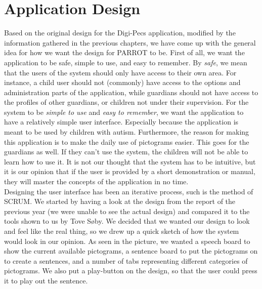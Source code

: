 \chapter{Application Design}
\label{appdes}
Based on the original design for the Digi-Pecs application, modified by the information gathered in the previous chapters, we have come up with the general idea for how we want the design for PARROT to be.\newline
First of all, we want the application to be safe, simple to use, and easy to remember.\newline
By \textit{safe}, we mean that the users of the system should only have access to their own area. For instance, a child user should not (commonly) have access to the options and administration parts of the application, while guardians should not have access to the profiles of other guardians, or children not under their supervision.\newline
For the system to be \textit{simple to use} and \textit{easy to remember}, we want the application to have a relatively simple user interface. Especially because the application is meant to be used by children with autism. Furthermore, the reason for making this application is to make the daily use of pictograms easier. This goes for the guardians as well. If they can't use the system, the children will not be able to learn how to use it.\newline
It is not our thought that the system has to be intuitive, but it is our opinion that if the user is provided by a short demonstration or manual, they will master the concepts of the application in no time.\newline
\\
Designing the user interface has been an iterative process, such is the method of SCRUM. We started by having a look at the design from the report of the previous year (we were unable to see the actual design) and compared it to the tools shown to us by Tove S\o{}by.%
We decided that we wanted our design to look and feel like the real thing, so we drew up a quick sketch of how the system would look in our opinion.\newline
As seen in the picture, we wanted a speech board to show the current available pictograms, a sentence board to put the pictograms on to create a sentences, and a number of tabs representing different categories of pictograms. We also put a play-button on the design, so that the user could press it to play out the sentence.\newline
